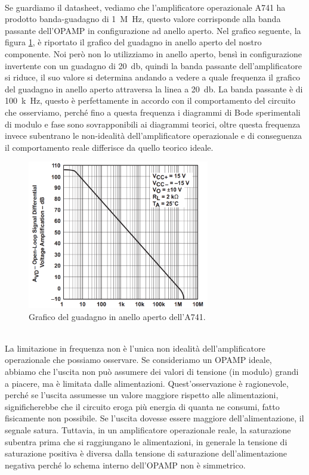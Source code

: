 \documentclass{report}
\begin{document}
\\Se guardiamo il datasheet, vediamo che l'amplificatore operazionale \textmu A741 ha prodotto banda-guadagno di \SI{1}{M\hertz}, questo valore corrisponde alla banda passante dell'OPAMP in configurazione ad anello aperto. Nel grafico seguente, la figura \ref{figura:bandaguad}, è riportato il grafico del guadagno in anello aperto del nostro componente. Noi però non lo utilizziamo in anello aperto, bensì in configurazione invertente con un guadagno di \SI{20}{\decibel}, quindi la banda passante dell'amplificatore si riduce, il suo valore si determina andando a vedere a quale frequenza il grafico del guadagno in anello aperto attraversa la linea a \SI{20}{\decibel}. La banda passante è di \SI{100}{k\hertz}, questo è perfettamente in accordo con il comportamento del circuito che osserviamo, perché fino a questa frequenza i diagrammi di Bode sperimentali di modulo e fase sono sovrapponibili ai diagrammi teorici, oltre questa frequenza invece subentrano le non-idealità dell'amplificatore operazionale e di conseguenza il comportamento reale differisce da quello teorico ideale.
\begin{figure}[h!]
	\centering
	\includegraphics[height=6.5cm]{immagini/gbw}
	\caption{Grafico del guadagno in anello aperto dell'\textmu A741.}
	\label{figura:bandaguad}
\end{figure}
\\La limitazione in frequenza non è l'unica non idealità dell'amplificatore operazionale che possiamo osservare. Se consideriamo un OPAMP ideale, abbiamo che l'uscita non può assumere dei valori di tensione (in modulo) grandi a piacere, ma è limitata dalle alimentazioni. Quest'osservazione è ragionevole, perché se l'uscita assumesse un valore maggiore rispetto alle alimentazioni, significherebbe che il circuito eroga più energia di quanta ne consumi, fatto fisicamente non possibile. Se l'uscita dovesse essere maggiore dell'alimentazione, il segnale satura. Tuttavia, in un amplificatore operazionale reale, la saturazione subentra prima che si raggiungano le alimentazioni, in generale la tensione di saturazione positiva è diversa dalla tensione di saturazione dell'alimentazione negativa perché lo schema interno dell'OPAMP non è simmetrico. \par %
\end{document}

